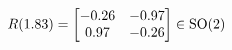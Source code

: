 \documentclass[preview]{standalone}
\begin{document}
\begin{align*}
\special{dvisvgm:raw <g id='unique000'>}R(1.83) = \begin{bmatrix} -0.26 & -0.97 \\ 0.97 & -0.26 \end{bmatrix} \in \text{SO}(2)\special{dvisvgm:raw </g>}
\end{align*}
\end{document}
